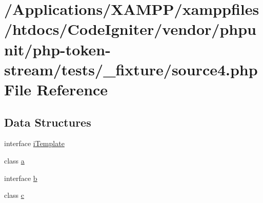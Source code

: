 \hypertarget{source4_8php}{}\section{/\+Applications/\+X\+A\+M\+P\+P/xamppfiles/htdocs/\+Code\+Igniter/vendor/phpunit/php-\/token-\/stream/tests/\+\_\+fixture/source4.php File Reference}
\label{source4_8php}
\subsection*{Data Structures}
\begin{DoxyCompactItemize}
\item 
interface \mbox{\hyperlink{interfacei_template}{i\+Template}}
\item 
class \mbox{\hyperlink{interfacea}{a}}
\item 
interface \mbox{\hyperlink{interfaceb}{b}}
\item 
class \mbox{\hyperlink{classc}{c}}
\end{DoxyCompactItemize}
